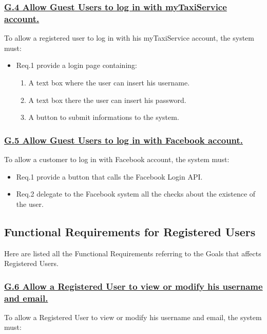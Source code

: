 			\subsubsection{\lbrack \hyperref[sec:g4]{G.4 Allow Guest Users to log in with myTaxiService account.}\rbrack}\label{sec:frs4}
			To allow a registered user to log in with his myTaxiService account, the system must:

				\begin{itemize}
					\item \lbrack Req.1\rbrack \label{sec:fr1_g4} provide a login page containing:
						\begin{enumerate}
							\item A text box where the user can insert his username.
							\item A text box there the user can insert his password.
							\item A button to submit informations to the system.
						\end{enumerate}
				\end{itemize}

			\subsubsection{\lbrack \hyperref[sec:g5]{G.5 Allow Guest Users to log in with Facebook account.}\rbrack}\label{sec:frs5}
			To allow a customer to log in with Facebook account, the system must:

				\begin{itemize}
					\item \lbrack Req.1\rbrack \label{sec:fr1_g5} provide a button that calls the Facebook Login API.
					\item \lbrack Req.2\rbrack \label{sec:fr2_g5} delegate to the Facebook system all the checks about the existence of the user.
				\end{itemize}

		\subsection{Functional Requirements for Registered Users}
		Here are listed all the Functional Requirements referring to the Goals that affects Registered Users.

			\subsubsection{\lbrack \hyperref[sec:g6]{G.6 Allow a Registered User to view or modify his username and email.}\rbrack}\label{sec:frs6}
			To allow a Registered User to view or modify his username and email, the system must:

